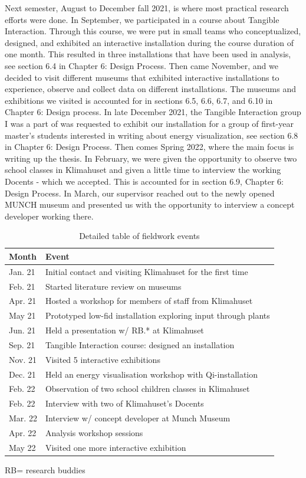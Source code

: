 Next semester, August to December fall 2021, is where most practical research efforts were done. In September, we participated in a course about Tangible Interaction. Through this course, we were put in small teams who conceptualized, designed, and exhibited an interactive installation during the course duration of one month. This resulted in three installations that have been used in analysis, see section 6.4 in Chapter 6: Design Process. Then came November, and we decided to visit different museums that exhibited interactive installations to experience, observe and collect data on different installations. The museums and exhibitions we visited is accounted for in sections 6.5, 6.6, 6.7, and 6.10 in Chapter 6: Design process. In late December 2021, the Tangible Interaction group I was a part of was requested to exhibit our installation for a group of first-year master's students interested in writing about energy visualization, see section 6.8 in Chapter 6: Design Process. Then comes Spring 2022, where the main focus is writing up the thesis. In February, we were given the opportunity to observe two school classes in Klimahuset and given a little time to interview the working Docents - which we accepted. This is accounted for in section 6.9, Chapter 6: Design Process. In March, our supervisor reached out to the newly opened MUNCH museum and presented us with the opportunity to interview a concept developer working there. %

\begin{table}[h]
\centering
\begin{tabular}{| l | l|}
\hline
\textbf{Month} & \textbf{Event}\\
\hline
Jan. 21 & Initial contact and visiting Klimahuset for the first time \\
Feb. 21 & Started literature review on museums \\
Apr. 21 & Hosted a workshop for members of staff from Klimahuset \\
May 21 & Prototyped low-fid installation exploring input through plants \\
Jun. 21 & Held a presentation w/ RB.* at Klimahuset \\
Sep. 21 & Tangible Interaction course: designed an installation \\
Nov. 21 & Visited 5 interactive exhibitions \\
Dec. 21 & Held an energy visualisation workshop with Qi-installation \\
Feb. 22 & Observation of two school children classes in Klimahuset \\
Feb. 22 & Interview with two of Klimahuset's Docents \\
Mar. 22 & Interview w/ concept developer at Munch Museum \\
Apr. 22 & Analysis workshop sessions \\
May 22 & Visited one more interactive exhibition \\
\hline
\end{tabular}
\caption{Detailed table of fieldwork events}{RB= research buddies}
\end{table}

